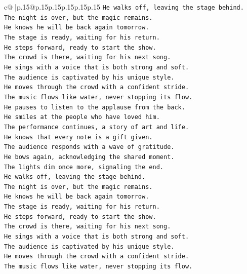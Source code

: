 \documentclass{article}
\begin{document}
{\begin{supertabular}{c@{$\;$}|p{.15\linewidth}@{}p{.15\linewidth}p{.15\linewidth}p{.15\linewidth}p{.15\linewidth}p{.15\linewidth}}
{{{\texttt{He walks off, leaving the stage behind.} \\
\texttt{The night is over, but the magic remains.} \\
\texttt{He knows he will be back again tomorrow.} \\
\texttt{The stage is ready, waiting for his return.} \\
\texttt{He steps forward, ready to start the show.} \\
\texttt{The crowd is there, waiting for his next song.} \\
\texttt{He sings with a voice that is both strong and soft.} \\
\texttt{The audience is captivated by his unique style.} \\
\texttt{He moves through the crowd with a confident stride.} \\
\texttt{The music flows like water, never stopping its flow.} \\
\texttt{He pauses to listen to the applause from the back.} \\
\texttt{He smiles at the people who have loved him.} \\
\texttt{The performance continues, a story of art and life.} \\
\texttt{He knows that every note is a gift given.} \\
\texttt{The audience responds with a wave of gratitude.} \\
\texttt{He bows again, acknowledging the shared moment.} \\
\texttt{The lights dim once more, signaling the end.} \\
\texttt{He walks off, leaving the stage behind.} \\
\texttt{The night is over, but the magic remains.} \\
\texttt{He knows he will be back again tomorrow.} \\
\texttt{The stage is ready, waiting for his return.} \\
\texttt{He steps forward, ready to start the show.} \\
\texttt{The crowd is there, waiting for his next song.} \\
\texttt{He sings with a voice that is both strong and soft.} \\
\texttt{The audience is captivated by his unique style.} \\
\texttt{He moves through the crowd with a confident stride.} \\
\texttt{The music flows like water, never stopping its flow.} \\
}}}
\end{supertabular}}
\end{document}
